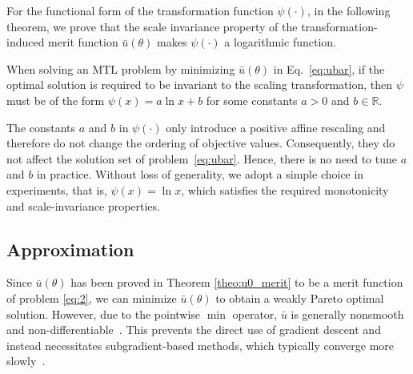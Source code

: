 \documentclass[sigconf]{acmart}
\begin{document}
For the functional form of the transformation function $\psi(\cdot)$, in the following theorem, we prove that the scale invariance property of the transformation-induced merit function $\bar u(\theta)$ makes $\psi(\cdot)$ a logarithmic function.

\begin{theorem}%
\label{thm:log_characterization}
When solving an MTL problem by minimizing $\bar{u}(\theta)$ in Eq.~\eqref{eq:ubar}, if the optimal solution is required to be invariant to the scaling transformation, then $\psi$ must be of the form $\psi(x) = a \ln x + b$ for some constants $a > 0$ and $b \in \mathbb{R}$.
\end{theorem}

The constants $a$ and $b$ in $\psi(\cdot)$ only introduce a positive affine rescaling and therefore do not change the ordering of objective values. Consequently, they do not affect the solution set of problem~\eqref{eq:ubar}. Hence, there is no need to tune $a$ and $b$ in practice. Without loss of generality, we adopt a simple choice in experiments, that is, $\psi(x) = \ln x$, which satisfies the required monotonicity and scale-invariance properties.

\subsection{Approximation}
\label{sec:app}
Since $\bar{u}(\theta)$ has been proved in Theorem \ref{theo:u0_merit} to be a merit function of problem \eqref{eq:2}, we can minimize $\bar{u}(\theta)$ to obtain a weakly Pareto optimal solution. 
However, due to the pointwise $\min$ operator, $\bar{u}$ is generally nonsmooth and non-differentiable~\cite{boyd2004convex}. 
This prevents the direct use of gradient descent and instead necessitates subgradient-based methods, which typically converge more slowly~\cite{goffin1977convergence}. %
\end{document}
